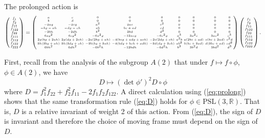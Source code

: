 \documentclass{article}
\def\R{\mathbb{R}}
\begin{document}
The prolonged action is
\begin{equation}
\tiny
\arraycolsep=1.4pt
\label{eq:prolong}
\left(
\begin{array}{c}
  \bar f_1 \\ \bar f_2 \\ \bar f_{11} \\ \bar f_{122} \\ \bar f_{22} \\ \bar f_{111} \\ \bar f_{112} \\ \bar f_{122} \\ \bar f_{222} 
 \end{array}
 \right)
 = 
\left(
\begin{array}{ccccccccc}
 a & c & 0 & 0 & 0 & 0 & 0 & 0 & 0 \\
 b & d & 0 & 0 & 0 & 0 & 0 & 0 & 0 \\
 -2 a g & -2 c g & a^2 & 2 a c & c^2 & 0 & 0 & 0 & 0 \\
 -b g-a h & -d g-c h & a b & b c+a d & c d & 0 & 0 & 0 & 0 \\
 -2 b h & -2 d h & b^2 & 2 b d & d^2 & 0 & 0 & 0 & 0 \\
 6 a g^2 & 6 c g^2 & -6 a^2 g & -12 a c g & -6 c^2 g & a^3 & 3 a^2 c & 3 a c^2 & c^3 \\
 2 g (b g+2 a h) & 2 g (d g+2 c h) & -2 a (2 b g+a h) & -4 (b c g+a d g+a c h) & -2 c (2 d
   g+c h) & a^2 b & a (2 b c+a d) & c (b c+2 a d) & c^2 d \\
 2 h (2 b g+a h) & 2 h (2 d g+c h) & -2 b (b g+2 a h) & -4 (b d g+b c h+a d h) & -2 d (d g+2
   c h) & a b^2 & b (b c+2 a d) & d (2 b c+a d) & c d^2 \\
 6 b h^2 & 6 d h^2 & -6 b^2 h & -12 b d h & -6 d^2 h & b^3 & 3 b^2 d & 3 b d^2 & d^3 \\
\end{array}
\right)\left(
\begin{array}{c}
f_1 \\ f_2 \\ f_{11} \\ f_{122} \\ f_{22} \\ f_{111} \\ f_{112} \\ f_{122} \\ f_{222} 
 \end{array}
 \right).
 \end{equation}

First, recall from the analysis of the subgroup $A(2)$ that under $f\mapsto f\circ \phi$, $\phi\in A(2)$, we have 
\begin{equation}
\label{eq:D}
D \mapsto (\det \phi')^2 D\circ \phi
\end{equation}
where $D = f_{1}^2 f_{22} + f_2^2 f_{11} - 2 f_1 f_2 f_{122}$. 
A direct calculation using (\ref{eq:prolong}) shows that the same transformation rule (\ref{eq:D}) holds for $\phi\in\mathrm{PSL}(3,\R)$.
That is, $D$ is a relative invariant of weight 2 of this action. From (\ref{eq:D}), the sign of $D$ is invariant and therefore
the choice of moving frame must depend on the sign of $D$.
\end{document}
